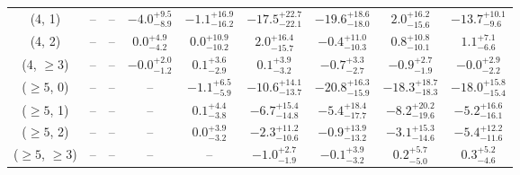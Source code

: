 \begin{table}[h!]
{\begin{tabular}{ccccccccc}
	(4, 1) & -- & -- & $-4.0^{+ 9.5 }_{- 8.9 }$ & $-1.1^{+ 16.9 }_{- 16.2 }$ & $-17.5^{+ 22.7 }_{- 22.1 }$ & $-19.6^{+ 18.6 }_{- 18.0 }$ & $2.0^{+ 16.2 }_{- 15.6 }$ & $-13.7^{+ 10.1 }_{- 9.6 }$ \\[0.5ex] 
	(4, 2) & -- & -- & $0.0^{+ 4.9 }_{- 4.2 }$ & $0.0^{+ 10.9 }_{- 10.2 }$ & $2.0^{+ 16.4 }_{- 15.7 }$ & $-0.4^{+ 11.0 }_{- 10.3 }$ & $0.8^{+ 10.8 }_{- 10.1 }$ & $1.1^{+ 7.1 }_{- 6.6 }$ \\[0.5ex] 
	(4, $\ge3$) & -- & -- & $-0.0^{+ 2.0 }_{- 1.2 }$ & $0.1^{+ 3.6 }_{- 2.9 }$ & $0.1^{+ 3.9 }_{- 3.2 }$ & $-0.7^{+ 3.3 }_{- 2.7 }$ & $-0.9^{+ 2.7 }_{- 1.9 }$ & $-0.0^{+ 2.9 }_{- 2.2 }$ \\[0.5ex] 
	($\ge5$, 0) & -- & -- & -- & $-1.1^{+ 6.5 }_{- 5.9 }$ & $-10.6^{+ 14.1 }_{- 13.7 }$ & $-20.8^{+ 16.3 }_{- 15.9 }$ & $-18.3^{+ 18.7 }_{- 18.3 }$ & $-18.0^{+ 15.8 }_{- 15.4 }$ \\[0.5ex] 
	($\ge5$, 1) & -- & -- & -- & $0.1^{+ 4.4 }_{- 3.8 }$ & $-6.7^{+ 15.4 }_{- 14.8 }$ & $-5.4^{+ 18.4 }_{- 17.7 }$ & $-8.2^{+ 20.2 }_{- 19.6 }$ & $-5.2^{+ 16.6 }_{- 16.1 }$ \\[0.5ex] 
	($\ge5$, 2) & -- & -- & -- & $0.0^{+ 3.9 }_{- 3.2 }$ & $-2.3^{+ 11.2 }_{- 10.6 }$ & $-0.9^{+ 13.9 }_{- 13.2 }$ & $-3.1^{+ 15.3 }_{- 14.6 }$ & $-5.4^{+ 12.2 }_{- 11.6 }$ \\[0.5ex] 
	($\ge5$, $\ge3$) & -- & -- & -- & -- & $-1.0^{+ 2.7 }_{- 1.9 }$ & $-0.1^{+ 3.9 }_{- 3.2 }$ & $0.2^{+ 5.7 }_{- 5.0 }$ & $0.3^{+ 5.2 }_{- 4.6 }$ \\[0.5ex] 
	\hline
	\hline
\end{tabular}}
\end{table}
